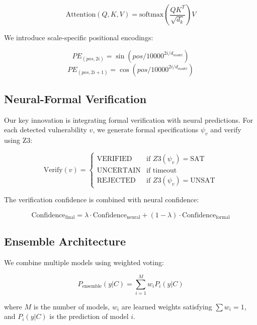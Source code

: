 \documentclass[10pt,journal,compsoc]{IEEEtran}
\begin{document}
\begin{equation}
\text{Attention}(Q, K, V) = \text{softmax}\left(\frac{QK^T}{\sqrt{d_k}}\right)V
\end{equation}

We introduce scale-specific positional encodings:

\begin{equation}
PE_{(pos,2i)} = \sin(pos/10000^{2i/d_{model}})
\end{equation}
\begin{equation}
PE_{(pos,2i+1)} = \cos(pos/10000^{2i/d_{model}})
\end{equation}

\subsection{Neural-Formal Verification}
Our key innovation is integrating formal verification with neural predictions. For each detected vulnerability $v$, we generate formal specifications $\psi_v$ and verify using Z3:

\begin{equation}
\text{Verify}(v) = \begin{cases}
\text{VERIFIED} & \text{if } Z3(\psi_v) = \text{SAT} \\
\text{UNCERTAIN} & \text{if } \text{timeout} \\
\text{REJECTED} & \text{if } Z3(\psi_v) = \text{UNSAT}
\end{cases}
\end{equation}

The verification confidence is combined with neural confidence:

\begin{equation}
\text{Confidence}_{\text{final}} = \lambda \cdot \text{Confidence}_{\text{neural}} + (1-\lambda) \cdot \text{Confidence}_{\text{formal}}
\end{equation}

\subsection{Ensemble Architecture}
We combine multiple models using weighted voting:

\begin{equation}
P_{\text{ensemble}}(y|C) = \sum_{i=1}^M w_i P_i(y|C)
\end{equation}

where $M$ is the number of models, $w_i$ are learned weights satisfying $\sum w_i = 1$, and $P_i(y|C)$ is the prediction of model $i$.
\end{document}
